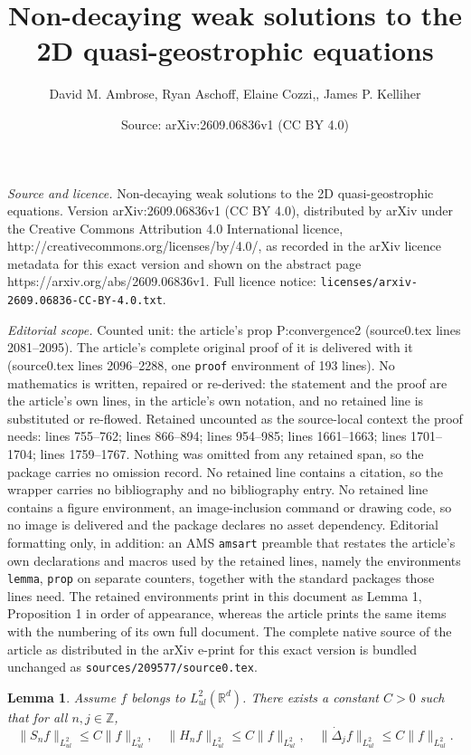 \documentclass[10pt,a4paper]{amsart}
\title{Non-decaying weak solutions to the 2D quasi-geostrophic equations}
\author{David M. Ambrose, Ryan Aschoff, Elaine Cozzi,, James P. Kelliher}
\date{Source: arXiv:2609.06836v1 (CC BY 4.0)}
\newtheorem{lemma}{Lemma}
\def\R{{\mathbb R}}
\def\Z{{\mathbb Z}}
\begin{document}
\maketitle

\noindent\emph{Source and licence.} Non-decaying weak solutions to the 2D quasi-geostrophic equations. Version arXiv:2609.06836v1 (CC BY 4.0), distributed by arXiv under the Creative Commons Attribution 4.0 International licence, http://creativecommons.org/licenses/by/4.0/, as recorded in the arXiv licence metadata for this exact version and shown on the abstract page https://arxiv.org/abs/2609.06836v1. Full licence notice: \texttt{licenses/arxiv-2609.06836-CC-BY-4.0.txt}.\par\smallskip

\noindent\textit{Editorial scope.} Counted unit: the article's prop P:convergence2 (source0.tex lines 2081--2095). The article's complete original proof of it is delivered with it (source0.tex lines 2096--2288, one \texttt{proof} environment of 193 lines). No mathematics is written, repaired or re-derived: the statement and the proof are the article's own lines, in the article's own notation, and no retained line is substituted or re-flowed.  Retained uncounted as the source-local context the proof needs: lines 755--762; lines 866--894; lines 954--985; lines 1661--1663; lines 1701--1704; lines 1759--1767.  Nothing was omitted from any retained span, so the package carries no omission record.  No retained line contains a citation, so the wrapper carries no bibliography and no bibliography entry.  No retained line contains a figure environment, an image-inclusion command or drawing code, so no image is delivered and the package declares no asset dependency.  Editorial formatting only, in addition: an AMS \texttt{amsart} preamble that restates the article's own declarations and macros used by the retained lines, namely the environments \texttt{lemma}, \texttt{prop} on separate counters, together with the standard packages those lines need.  The retained environments print in this document as Lemma 1, Proposition 1 in order of appearance, whereas the article prints the same items with the numbering of its own full document.  The complete native source of the article as distributed in the arXiv e-print for this exact version is bundled unchanged as \texttt{sources/209577/source0.tex}.
\begin{lemma}\label{SnBound}
Assume $f$ belongs to $L^2_{ul}(\R^d)$.  There exists a constant $C>0$ such that for all $n, j\in\Z$,
    \begin{equation*}
        \| S_n f \|_{L^2_{ul}} \leq C\|f \|_{L^2_{ul}},\quad
        \| H_n f \|_{L^2_{ul}} \leq C\|f \|_{L^2_{ul}},\quad
        \| \dot{\Delta}_j f \|_{L^2_{ul}} \leq C\|f \|_{L^2_{ul}}.
    \end{equation*}
\end{lemma}
\end{document}

